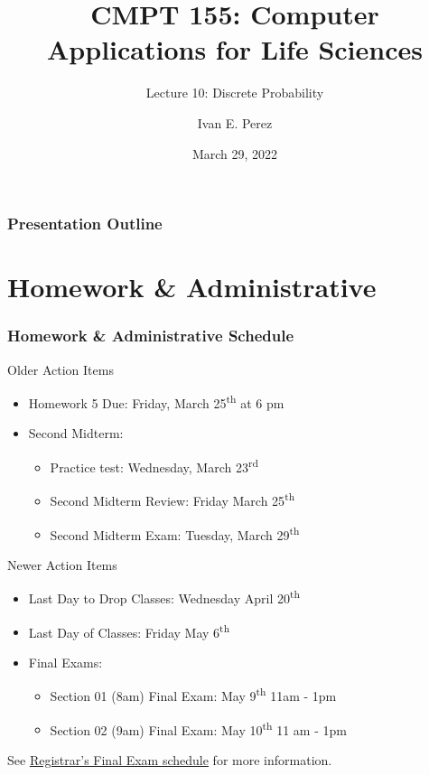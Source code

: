 \documentclass[12pt]{beamer}
\title{CMPT 155: Computer Applications for Life Sciences}
\subtitle{Lecture 10: Discrete Probability}
\author{Ivan E. Perez}
\institute{}
\date{March 29, 2022}
\begin{document}
	
	\begin{frame}
		\titlepage
	\end{frame}
	
	\begin{frame}
		\frametitle{Presentation Outline}
		\tableofcontents
	\end{frame}
	\section{Homework \& Administrative}
	
	\begin{frame}
		\frametitle{Homework \& Administrative Schedule}
		Older Action Items
		\begin{itemize}
			\item Homework 5 Due: Friday, March 25\textsuperscript{th} at 6 pm
			\item Second Midterm:
			\begin{itemize}
				\item  Practice test:  Wednesday, March 23\textsuperscript{rd}
				\item Second Midterm Review: Friday March 25\textsuperscript{th}
				\item Second Midterm Exam: Tuesday, March 29\textsuperscript{th}
			\end{itemize}
		\end{itemize}
		Newer Action Items
		\begin{itemize}
			\item Last Day to Drop Classes:  Wednesday April 20\textsuperscript{th}
			\item Last Day of Classes: Friday May 6\textsuperscript{th}
			\item Final Exams:
				\begin{itemize}
					\item Section 01 (8am) Final Exam: May 9\textsuperscript{th} 11am - 1pm
					\item Section 02 (9am) Final Exam: May 10\textsuperscript{th} 11 am - 1pm
				\end{itemize}
		\end{itemize}
	See \href{https://inside.manhattan.edu/academic-resources/registrar/final-exam-schedule.php}{Registrar's Final Exam schedule} for more information. 
	\end{frame}
\end{document}
